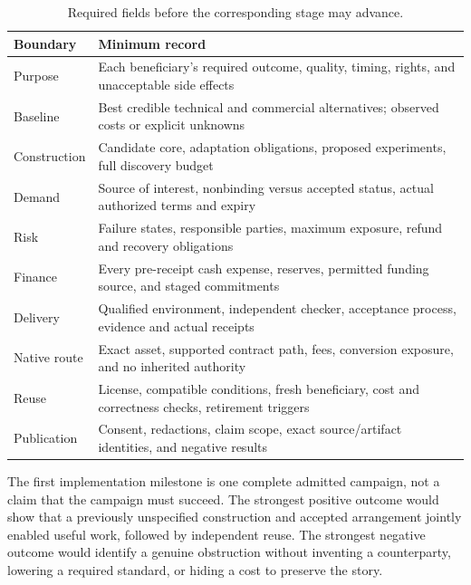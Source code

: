 \documentclass[11pt,letterpaper]{article}
\theoremstyle{remark}\newtheorem{remark}{Remark}[section]
\begin{document}
\begin{table}[htbp]\centering\small
\caption{Required fields before the corresponding stage may advance.}
\begin{tabularx}{\linewidth}{@{}P{.25\linewidth}Y@{}}\toprule
Boundary & Minimum record\\\midrule
Purpose & Each beneficiary's required outcome, quality, timing, rights, and unacceptable side effects\\
Baseline & Best credible technical and commercial alternatives; observed costs or explicit unknowns\\
Construction & Candidate core, adaptation obligations, proposed experiments, full discovery budget\\
Demand & Source of interest, nonbinding versus accepted status, actual authorized terms and expiry\\
Risk & Failure states, responsible parties, maximum exposure, refund and recovery obligations\\
Finance & Every pre-receipt cash expense, reserves, permitted funding source, and staged commitments\\
Delivery & Qualified environment, independent checker, acceptance process, evidence and actual receipts\\
Native route & Exact asset, supported contract path, fees, conversion exposure, and no inherited authority\\
Reuse & License, compatible conditions, fresh beneficiary, cost and correctness checks, retirement triggers\\
Publication & Consent, redactions, claim scope, exact source/artifact identities, and negative results\\\bottomrule
\end{tabularx}
\end{table}

The first implementation milestone is one complete admitted campaign, not a claim that the campaign must succeed. The strongest positive outcome would show that a previously unspecified construction and accepted arrangement jointly enabled useful work, followed by independent reuse. The strongest negative outcome would identify a genuine obstruction without inventing a counterparty, lowering a required standard, or hiding a cost to preserve the story.

\FloatBarrier
{}
\end{document}

